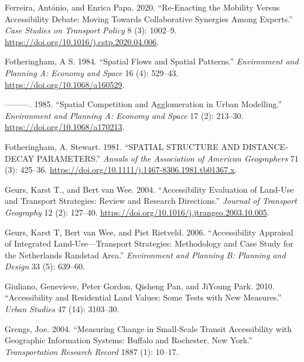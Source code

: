 \documentclass[
]{article}
\newlength{\cslhangindent}
\newenvironment{CSLReferences}[2] %
 {\begin{list}{}{%
  \setlength{\itemindent}{0pt}
  \setlength{\leftmargin}{0pt}
  \setlength{\parsep}{0pt}
  \ifodd #1
   \setlength{\leftmargin}{\cslhangindent}
   \setlength{\itemindent}{-1\cslhangindent}
  \fi
  \setlength{\itemsep}{#2\baselineskip}}}
 {\end{list}}
\begin{document}
\begin{CSLReferences}{1}{0}
Ferreira, António, and Enrica Papa. 2020. {``Re-Enacting the Mobility
Versus Accessibility Debate: Moving Towards Collaborative Synergies
Among Experts.''} \emph{Case Studies on Transport Policy} 8 (3):
1002--9. \url{https://doi.org/10.1016/j.cstp.2020.04.006}.

Fotheringham, A S. 1984. {``Spatial {Flows} and {Spatial} {Patterns}.''}
\emph{Environment and Planning A: Economy and Space} 16 (4): 529--43.
\url{https://doi.org/10.1068/a160529}.

---------. 1985. {``Spatial Competition and Agglomeration in Urban
Modelling.''} \emph{Environment and Planning A: Economy and Space} 17
(2): 213--30. \url{https://doi.org/10.1068/a170213}.

Fotheringham, A. Stewart. 1981. {``{SPATIAL} {STRUCTURE} {AND}
{DISTANCE}‐{DECAY} {PARAMETERS}.''} \emph{Annals of the Association of
American Geographers} 71 (3): 425--36.
\url{https://doi.org/10.1111/j.1467-8306.1981.tb01367.x}.

Geurs, Karst T., and Bert van Wee. 2004. {``Accessibility Evaluation of
Land-Use and Transport Strategies: Review and Research Directions.''}
\emph{Journal of Transport Geography} 12 (2): 127--40.
\url{https://doi.org/10.1016/j.jtrangeo.2003.10.005}.

Geurs, Karst T, Bert van Wee, and Piet Rietveld. 2006. {``Accessibility
Appraisal of Integrated Land-Use---Transport Strategies: Methodology and
Case Study for the Netherlands Randstad Area.''} \emph{Environment and
Planning B: Planning and Design} 33 (5): 639--60.

Giuliano, Genevieve, Peter Gordon, Qisheng Pan, and JiYoung Park. 2010.
{``Accessibility and Residential Land Values: Some Tests with New
Measures.''} \emph{Urban Studies} 47 (14): 3103--30.

Grengs, Joe. 2004. {``Measuring Change in Small-Scale Transit
Accessibility with Geographic Information Systems: Buffalo and
Rochester, New York.''} \emph{Transportation Research Record} 1887 (1):
10--17.


\end{CSLReferences}
\end{document}
